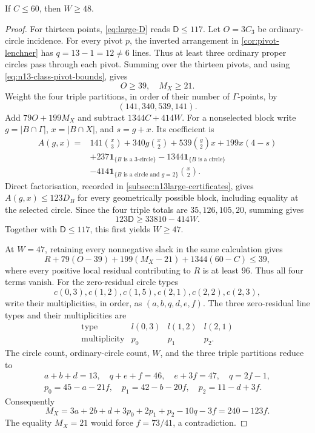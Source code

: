 \begin{lemma}
\label{lem:n13-gamma6-opening}
If $C\leq60$, then $W\geq48$.
\end{lemma}

\begin{proof}
For thirteen points, \eqref{eq:large-D} reads $\mathsf D\leq117$.
Let $O=3C_3$ be ordinary-circle incidence.  For every pivot $p$, the
inverted arrangement in \cref{cor:pivot-lenchner} has
$q=13-1=12\neq6$ lines.
Thus at least three ordinary proper circles pass through each pivot.
Summing over the thirteen pivots, and using
\eqref{eq:n13-class-pivot-bounds}, gives
\[
 O\geq39,\quad M_X\geq21.
\]
Weight the four triple partitions, in order of their number of
$\Gamma$-points, by
\[
 (141,340,539,141).
\]
Add $79O+199M_X$ and subtract $1344C+414W$.  For a nonselected block
write $g=|B\cap\Gamma|$, $x=|B\cap X|$, and $s=g+x$.  Its coefficient is
\begin{align*}
 A(g,x)={}&141\binom x3+340g\binom x2
  +539\binom g2x+199x(4-s)\\
 &+237\mathbf{1}_{\{B\text{ is a }3\text{-circle}\}}
  -1344\mathbf{1}_{\{B\text{ is a circle}\}}\\
 &-414\mathbf{1}_{\{B\text{ is a circle and }g=2\}}\binom x2.
\end{align*}
Direct factorisation, recorded in
\cref{subsec:n13large-certificates}, gives $A(g,x)\leq123D_B$ for every
geometrically possible block, including equality at the selected circle.
Since the four triple totals are $35,126,105,20$, summing gives
\begin{equation}
 123\mathsf D\geq33810-414W.                       \label{eq:n13-opening-dual}
\end{equation}
Together with $\mathsf D\leq117$, this first yields $W\geq47$.

At $W=47$, retaining every nonnegative slack in the same calculation gives
\[
 R+79(O-39)+199(M_X-21)+1344(60-C)\leq39,
\]
where every positive local residual contributing to $R$ is at least $96$.
Thus all four terms vanish.  For the zero-residual circle types
\[
 c(0,3),c(1,2),c(1,5),c(2,1),c(2,2),c(2,3),
\]
write their multiplicities, in order, as $(a,b,q,d,e,f)$.  The three
zero-residual line types and their multiplicities are
\[
\begin{array}{c|ccc}
\text{type}&l(0,3)&l(1,2)&l(2,1)\\ \hline
\text{multiplicity}&p_0&p_1&p_2.
\end{array}
\]
The circle count, ordinary-circle count, $W$, and the three triple
partitions reduce to
\begin{gather*}
 a+b+d=13,\quad q+e+f=46,\quad e+3f=47,\quad q=2f-1,\\
 p_0=45-a-21f,\quad p_1=42-b-20f,\quad p_2=11-d+3f.
\end{gather*}
Consequently
\[
 M_X=3a+2b+d+3p_0+2p_1+p_2-10q-3f=240-123f.
\]
The equality $M_X=21$ would force $f=73/41$, a contradiction.
\end{proof}

